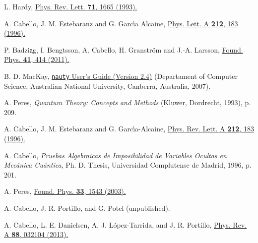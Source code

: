 \documentclass[%
  twocolumn,
 showpacs,
 showkeys,
 preprintnumbers,
 amsmath,amssymb,
 aps,
  pra,
  longbibliography,
 floatfix,
 ]{revtex4-1}
\begin{document}
\begin{thebibliography}{99}
 L. Hardy,
 \href{http://dx.doi.org/10.1103/PhysRevLett.71.1665}{Phys. Rev. Lett. \textbf{71}, 1665 (1993).}

 A. Cabello, J. M. Estebaranz and G. Garc\'{\i}a Alcaine,
 \href{http://dx.doi.org/10.1016/0375-9601(96)00134-X}{Phys. Lett. A \textbf{212}, 183 (1996).}

 P. Badzi{\c a}g, I. Bengtsson, A. Cabello, H. Granstr\"om and J.-A. Larsson,
 \href{http://link.springer.com/article/10.1007%2Fs10701-010-9433-3}{Found. Phys. \textbf{41}, 414 (2011).}

 B. D. MacKay,
 \href{http://cs.anu.edu.au/~Brendan.McKay/nauty/nug.pdf}{\texttt{nauty} User's Guide (Version 2.4)}
 (Departament of Computer Science, Australian National University, Canberra, Australia, 2007).

 A. Peres, \emph{Quantum Theory: Concepts and Methods} (Kluwer, Dordrecht, 1993), p. 209.

 A. Cabello, J. M. Estebaranz and G. Garc\'{\i}a-Alcaine, \href{http://www.sciencedirect.com/science/article/pii/037596019600134X?via=ihub}{Phys. Rev. Lett. A \textbf{212}, 183 (1996).}

 A. Cabello,
 \emph{Pruebas Algebraicas de Imposibilidad de Variables Ocultas en Mec{\'a}nica Cu{\'a}ntica}, Ph. D. Thesis, Universidad Complutense de Madrid, 1996, p. 201.

 A. Peres,
\href{http://link.springer.com/article/10.1023\%2FA\%3A1026000614638}{Found. Phys. \textbf{33}, 1543 (2003).}

 A. Cabello, J. R. Portillo, and G. Potel (unpublished).

 A. Cabello, L. E. Danielsen, A. J. L\'opez-Tarrida, and J. R. Portillo,
 \href{http://dx.doi.org/10.1103/PhysRevA.88.032104}{Phys. Rev. A \textbf{88}, 032104 (2013).}


\end{thebibliography}

\end{document}
